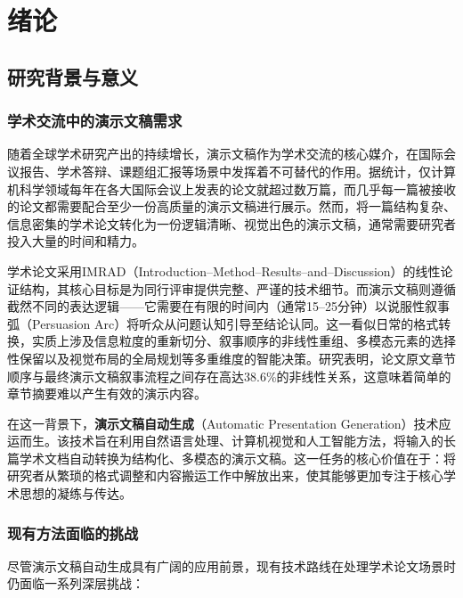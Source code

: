 
\chapter{绪论}

\section{研究背景与意义}

\subsection{学术交流中的演示文稿需求}

随着全球学术研究产出的持续增长，演示文稿作为学术交流的核心媒介，在国际会议报告、学术答辩、课题组汇报等场景中发挥着不可替代的作用。据统计，仅计算机科学领域每年在各大国际会议上发表的论文就超过数万篇\cite{chen2020survey}，而几乎每一篇被接收的论文都需要配合至少一份高质量的演示文稿进行展示。然而，将一篇结构复杂、信息密集的学术论文转化为一份逻辑清晰、视觉出色的演示文稿，通常需要研究者投入大量的时间和精力。

学术论文采用IMRAD（Introduction--Method--Results--and--Discussion）的线性论证结构\cite{sollaci2004introduction}，其核心目标是为同行评审提供完整、严谨的技术细节。而演示文稿则遵循截然不同的表达逻辑——它需要在有限的时间内（通常15--25分钟）以说服性叙事弧（Persuasion Arc）将听众从问题认知引导至结论认同\cite{reynolds2011presentation}。这一看似日常的格式转换，实质上涉及信息粒度的重新切分、叙事顺序的非线性重组、多模态元素的选择性保留以及视觉布局的全局规划等多重维度的智能决策。研究表明，论文原文章节顺序与最终演示文稿叙事流程之间存在高达38.6\%的非线性关系\cite{sun2021d2s}，这意味着简单的章节摘要难以产生有效的演示内容。

在这一背景下，\textbf{演示文稿自动生成}（Automatic Presentation Generation）技术应运而生。该技术旨在利用自然语言处理、计算机视觉和人工智能方法，将输入的长篇学术文档自动转换为结构化、多模态的演示文稿\cite{hu2015ppsgen,fu2022doc2ppt}。这一任务的核心价值在于：将研究者从繁琐的格式调整和内容搬运工作中解放出来，使其能够更加专注于核心学术思想的凝练与传达。

\subsection{现有方法面临的挑战}

尽管演示文稿自动生成具有广阔的应用前景，现有技术路线在处理学术论文场景时仍面临一系列深层挑战：

